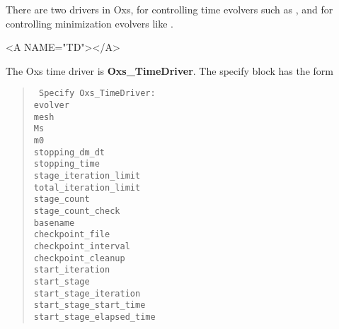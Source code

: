 There are two drivers in Oxs,
for controlling time evolvers such as
,
and
for controlling minimization evolvers like
.

\begin{description}
\begin{rawhtml}<A NAME="TD"></A>\end{rawhtml}%
%
\item[Oxs\_TimeDriver:\label{item:TimeDriver}]
The Oxs time driver is \textbf{Oxs\_TimeDriver}.  The specify block has
the form
\begin{latexonly}
\begin{quote}\tt
Specify Oxs\_TimeDriver: \ocb\\
 \bi evolver \\
 \bi mesh \\
 \bi Ms \\
 \bi m0 \\
 \bi stopping\_dm\_dt \\
 \bi stopping\_time \\
 \bi stage\_iteration\_limit \\
 \bi total\_iteration\_limit \\
 \bi stage\_count \\
 \bi stage\_count\_check \\
 \bi basename \\
 \bi checkpoint\_file \\
 \bi checkpoint\_interval \\
 \bi checkpoint\_cleanup \\
 \bi start\_iteration \\
 \bi start\_stage \\
 \bi start\_stage\_iteration \\
 \bi start\_stage\_start\_time \\
 \bi start\_stage\_elapsed\_time \\

\end{quote}
\end{latexonly}
\end{description}
